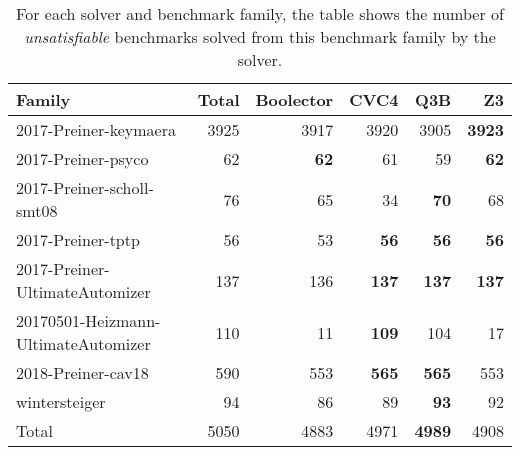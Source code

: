 \begin{table}[tbp]
\centering
\begin{tabular}{lrrrrr}
  \toprule
Family & Total & Boolector & CVC4 & Q3B & Z3 \\ 
  \midrule
2017-Preiner-keymaera & 3925 & 3917 & 3920 & 3905 & \textbf{3923} \\ 
  2017-Preiner-psyco &  62 & \textbf{62} & 61 & 59 & \textbf{62} \\ 
  2017-Preiner-scholl-smt08 &  76 & 65 & 34 & \textbf{70} & 68 \\ 
  2017-Preiner-tptp &  56 & 53 & \textbf{56} & \textbf{56} & \textbf{56} \\ 
  2017-Preiner-UltimateAutomizer & 137 & 136 & \textbf{137} & \textbf{137} & \textbf{137} \\ 
  20170501-Heizmann-UltimateAutomizer & 110 & 11 & \textbf{109} & 104 & 17 \\ 
  2018-Preiner-cav18 & 590 & 553 & \textbf{565} & \textbf{565} & 553 \\ 
  wintersteiger &  94 & 86 & 89 & \textbf{93} & 92 \\ 
   \midrule
Total & 5050 & 4883 & 4971 & \textbf{4989} & 4908 \\ 
   \bottomrule
\end{tabular}
\caption{For each solver and benchmark family, the table shows the number of \emph{unsatisfiable} benchmarks solved from this benchmark family by the solver.} 
\label{tbl:unsatSolved}
\end{table}
